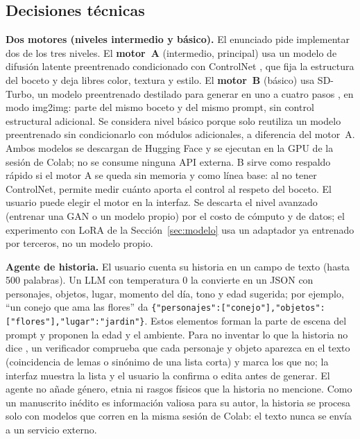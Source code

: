 \documentclass[10pt,a4paper,twocolumn]{article}
\begin{document}
\subsection{Decisiones técnicas}
\textbf{Dos motores (niveles intermedio y básico).} El enunciado pide implementar dos de los tres niveles. El \textbf{motor~A} (intermedio, principal) usa un modelo de difusión latente preentrenado \citep{rombach2022} condicionado con ControlNet \citep{zhang2023}, que fija la estructura del boceto y deja libres color, textura y estilo. El \textbf{motor~B} (básico) usa SD-Turbo, un modelo preentrenado destilado para generar en uno a cuatro pasos \citep{sauer2023}, en modo img2img: parte del mismo boceto y del mismo prompt, sin control estructural adicional. Se considera nivel básico porque solo reutiliza un modelo preentrenado sin condicionarlo con módulos adicionales, a diferencia del motor~A. Ambos modelos se descargan de Hugging Face y se ejecutan en la GPU de la sesión de Colab; no se consume ninguna API externa. B sirve como respaldo rápido si el motor A se queda sin memoria y como línea base: al no tener ControlNet, permite medir cuánto aporta el control al respeto del boceto. El usuario puede elegir el motor en la interfaz. Se descarta el nivel avanzado (entrenar una GAN o un modelo propio) por el costo de cómputo y de datos; el experimento con LoRA de la Sección~\ref{sec:modelo} usa un adaptador ya entrenado por terceros, no un modelo propio.

\textbf{Agente de historia.} El usuario cuenta su historia en un campo de texto (hasta 500 palabras). Un LLM con temperatura 0 la convierte en un JSON con personajes, objetos, lugar, momento del día, tono y edad sugerida; por ejemplo, ``un conejo que ama las flores'' da \lstinline[basicstyle=\ttfamily\footnotesize]|{"personajes":["conejo"],"objetos":["flores"],"lugar":"jardin"}|. Estos elementos forman la parte de escena del prompt y proponen la edad y el ambiente. Para no inventar lo que la historia no dice \citep{maynez2020}, un verificador comprueba que cada personaje y objeto aparezca en el texto (coincidencia de lemas o sinónimo de una lista corta) y marca los que no; la interfaz muestra la lista y el usuario la confirma o edita antes de generar. El agente no añade género, etnia ni rasgos físicos que la historia no mencione. Como un manuscrito inédito es información valiosa para su autor, la historia se procesa solo con modelos que corren en la misma sesión de Colab: el texto nunca se envía a un servicio externo.
\end{document}
